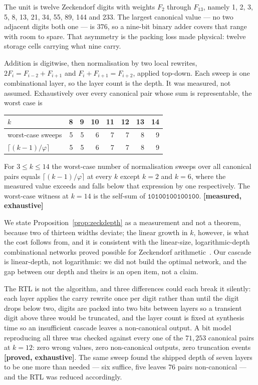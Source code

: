 The unit is twelve Zeckendorf digits with weights $F_2$ through $F_{13}$, namely
1, 2, 3, 5, 8, 13, 21, 34, 55, 89, 144 and 233. The largest canonical value --- no two adjacent digits
both one --- is $376$, so a nine-bit binary adder covers that range with room
to spare. That asymmetry is the packing loss made physical: twelve storage cells
carrying what nine carry.

Addition is digitwise, then normalisation by two local rewrites,
$2F_i = F_{i-2} + F_{i+1}$ and $F_i + F_{i+1} = F_{i+2}$, applied top-down. Each
sweep is one combinational layer, so the layer count is the depth. It was
measured, not assumed. Exhaustively over every canonical pair whose sum is
representable, the worst case is

\begin{center}
\begin{tabular}{lrrrrrrr}
\toprule
$k$ & 8 & 9 & 10 & 11 & 12 & 13 & 14 \\
\midrule
worst-case sweeps & 5 & 5 & 6 & 7 & 7 & 8 & 9 \\
$\lceil (k-1)/\varphi \rceil$ & 5 & 5 & 6 & 7 & 7 & 8 & 9 \\
\bottomrule
\end{tabular}
\end{center}

\begin{proposition}
\label{prop:zeckdepth}
For $3 \le k \le 14$ the worst-case number of normalisation sweeps over all
canonical pairs equals $\lceil (k-1)/\varphi\rceil$ at every $k$ except $k=2$ and
$k=6$, where the measured value exceeds and falls below that expression by one
respectively. The worst-case witness at $k = 14$ is the self-sum of
$\texttt{10100100100100}$. \textbf{[measured, exhaustive]}
\end{proposition}

We state Proposition~\ref{prop:zeckdepth} as a measurement and not a theorem,
because two of thirteen widths deviate; the linear growth in $k$, however, is what
the cost follows from, and it is consistent with the linear-size,
logarithmic-depth combinational networks proved possible for Zeckendorf
arithmetic~\cite{ahlbach2012efficient}. Our cascade is linear-depth, not
logarithmic: we did not build the optimal network, and the gap between our depth
and theirs is an open item, not a claim.

The RTL is not the algorithm, and three differences could each break it silently:
each layer applies the carry rewrite once per digit rather than until the digit
drops below two, digits are packed into two bits between layers so a transient
digit above three would be truncated, and the layer count is fixed at synthesis
time so an insufficient cascade leaves a non-canonical output. A bit model
reproducing all three was checked against every one of the $71{,}253$ canonical
pairs at $k = 12$: zero wrong values, zero non-canonical outputs, zero
truncation events \textbf{[proved, exhaustive]}. The same sweep found the
shipped depth of seven layers to be one more than needed --- six suffice, five
leaves 76 pairs non-canonical --- and the RTL was reduced accordingly.

